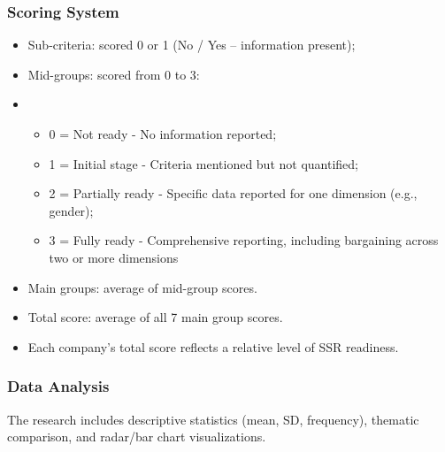 \subsubsection{Scoring System}
\begin{itemize}
    \item Sub-criteria: scored 0 or 1 (No / Yes -- information present);
    \item Mid-groups: scored from 0 to 3:
    \item \begin{itemize}
        \item 0 = Not ready - No information reported;
        \item 1 = Initial stage - Criteria mentioned but not quantified;
        \item 2 = Partially ready - Specific data reported for one dimension (e.g., gender);
        \item 3 = Fully ready - Comprehensive reporting, including bargaining across two or more dimensions
    \end{itemize}
    \item Main groups: average of mid-group scores.
    \item Total score: average of all 7 main group scores.
    \item Each company's total score reflects a relative level of SSR readiness.
\end{itemize}

\subsubsection{Data Analysis}
The research includes descriptive statistics (mean, SD, frequency), thematic comparison, and radar/bar chart visualizations.


